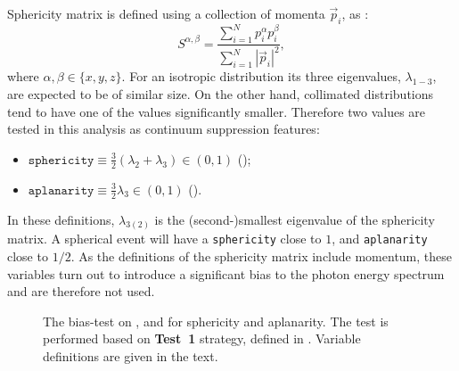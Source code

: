 Sphericity matrix is defined using a collection of momenta $\vec{p}_i$, as \cite{BaBar:2014omp}:
\begin{equation}
    S^{\alpha,\beta} = \frac{\sum^N_{i=1}p_i^{\alpha}p_i^{\beta}}{\sum^N_{i=1}|\vec{p}_i|^2},
\end{equation}
where $\alpha,\beta\in\{x,y,z\}$.
For an isotropic distribution its three eigenvalues, $\lambda_{1-3}$, are expected to be of similar size.
On the other hand, collimated distributions tend to have one of the values significantly smaller.
Therefore two values are tested in this analysis as continuum suppression features:
\begin{itemize}
    \item $\mathtt{sphericity}\equiv\frac{3}{2}(\lambda_2+\lambda_3)\in(0,1)$ ();
    \item $\mathtt{aplanarity}\equiv\frac{3}{2}\lambda_3\in(0,1)$ ().
\end{itemize}
In these definitions, $\lambda_{3(2)}$ is the (second-)smallest eigenvalue of the sphericity matrix.
A spherical event will have a \texttt{sphericity} close to $1$, and \texttt{aplanarity} close to $1/2$.
As the definitions of the sphericity matrix include momentum, these variables turn out to introduce a significant bias to the photon energy spectrum and are therefore not used.

\begin{figure}[htbp!]
    \caption{\label{fig:sphericity_aplanarity} The bias-test on \EB, \Estar and \Mbc for sphericity and aplanarity.
    The test is performed based on \textbf{Test~1} strategy, defined in .
    Variable definitions are given in the text.}
\end{figure}